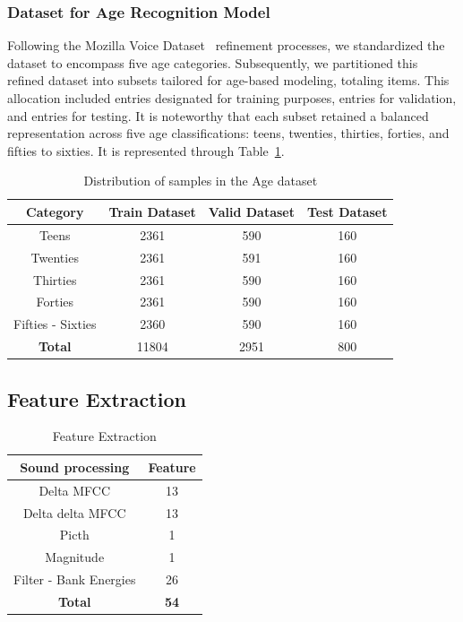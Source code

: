 \documentclass[conference, 10pt,onecolumn]{IEEEtran}
\begin{document}
\subsubsection{Dataset for Age Recognition Model}
 Following the Mozilla Voice Dataset~\cite{mozilla_voice} refinement processes, we standardized the dataset to encompass five age categories. Subsequently, we partitioned this refined dataset into subsets tailored for age-based modeling, totaling %
 items. This allocation included %
 entries designated for training purposes, %
 entries for validation, and %
 entries for testing. It is noteworthy that each subset retained a balanced representation across five age classifications: teens, twenties, thirties, forties, and fifties to sixties. It is represented through Table~\ref{tab:Distribution of samples in the Age dataset}.

\begin{table}[htbp]
    \centering
    \begin{tabular}{|c|ccc|}
    \hline
    \textbf{Category} & \textbf{Train Dataset} & \textbf{Valid Dataset} & \textbf{Test Dataset}\\
    \hline
    Teens & 2361 & 590 & 160 \\
    Twenties & 2361 & 591 & 160 \\
    Thirties & 2361 & 590 & 160 \\
    Forties & 2361 & 590 & 160 \\
    Fifties - Sixties & 2360 & 590 & 160 \\
    \hline
    \textbf{Total} & 11804 & 2951 & 800\\
    \hline
    \end{tabular}
    \caption{Distribution of samples in the Age dataset}
    \label{tab:Distribution of samples in the Age dataset}
\end{table}
\subsection{Feature Extraction}             %

\begin{table}[htbp]
    \centering
    \begin{tabular}{|c|c|}
        \hline
        \textbf{Sound processing} & \textbf{Feature} \\
        \hline
        Delta MFCC & 13 \\
        Delta delta MFCC & 13\\
        Picth & 1 \\
        Magnitude & 1 \\ 
        Filter - Bank Energies & 26\\
        \hline
        \textbf{Total} & \textbf{54} \\
        \hline 
    \end{tabular}
    \caption{Feature Extraction}
    \label{tab:Feature Extraction}
\end{table}
\end{document}
